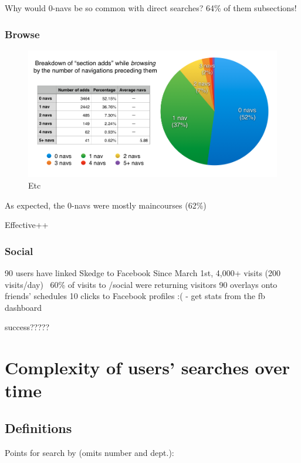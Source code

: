   Why would 0-navs be so common with direct searches? 64\% of them subsections!

  \subsubsection{Browse}

  \begin{figure}
    \centering
    \includegraphics[width=1.0\textwidth]{images/graph/browse_navs}

    \caption{Etc}
    \label{fig:searchtypes}
  \end{figure}

  As expected, the 0-navs were mostly maincourses (62\%)

  Effective++

  \subsubsection{Social}

  90 users have linked Skedge to Facebook
  Since March 1st,
  4,000+ visits (200 visits/day)
  ~60\% of visits to /social were returning visitors
  90 overlays onto friends’ schedules
  10 clicks to Facebook profiles :(
  - get stats from the fb dashboard

  success?????


\section{Complexity of users' searches over time}

\subsection{Definitions}

Points for search by (omits number and dept.):

